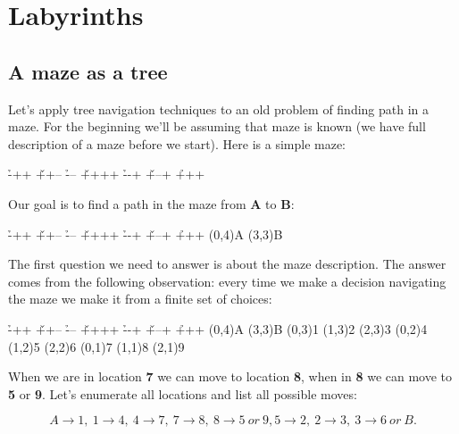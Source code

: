 \chapter{Labyrinths}

\section{A maze as a tree}
Let's apply tree navigation techniques to an old problem
of finding path in a maze. For the beginning we'll be assuming that
maze is known (we have full description of a maze before we start).
Here is a simple maze:

\begin{labyrinth}{3}{4}
        \h -++
\v ++-- \h ---
\v ++++ \h --+
\v +--+ \h +++
\end{labyrinth}

Our goal is to find a path in the maze from \textbf{A} to \textbf{B}:

\begin{labyrinth}{3}{4}
        \h -++
\v ++-- \h ---
\v ++++ \h --+
\v +--+ \h +++
\putsymbol(0,4){\small{A}}
\putsymbol(3,3){\small{B}}
\end{labyrinth}

The first question we need to answer is about the maze description.
The answer comes from the following observation: every time we
make a decision navigating the maze we make it from a finite set
of choices:

\begin{labyrinth}{3}{4}
        \h -++
\v ++-- \h ---
\v ++++ \h --+
\v +--+ \h +++
\putsymbol(0,4){\small{A}}
\putsymbol(3,3){\small{B}}
\putsymbol(0,3){\small{1}}
\putsymbol(1,3){\small{2}}
\putsymbol(2,3){\small{3}}
\putsymbol(0,2){\small{4}}
\putsymbol(1,2){\small{5}}
\putsymbol(2,2){\small{6}}
\putsymbol(0,1){\small{7}}
\putsymbol(1,1){\small{8}}
\putsymbol(2,1){\small{9}}
\end{labyrinth}


When we are in location \textbf{7} we can move to location 
\textbf{8}, when in \textbf{8} we can move to \textbf{5} or \textbf{9}.
Let's enumerate all locations and list all possible moves:

$$A\rightarrow 1,\ 1\rightarrow 4,\ 
4\rightarrow 7,\ 7\rightarrow 8,\ 8\rightarrow 5\ or\ 9,
5\rightarrow 2,\ 2\rightarrow 3,\ 3\rightarrow 6\ or\ B.$$

